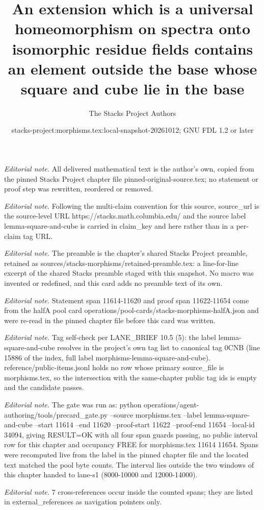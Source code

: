 \documentclass[10pt,a4paper]{amsart}
\title{An extension which is a universal homeomorphism on spectra onto isomorphic residue fields contains an element outside the base whose square and cube lie in the base}
\author{The Stacks Project Authors}
\date{stacks-project:morphisms.tex:local-snapshot-20261012; GNU FDL 1.2 or later}
\theoremstyle{plain}
\theoremstyle{definition}
\theoremstyle{remark}
\numberwithin{equation}{subsection}
\begin{document}
\maketitle
\noindent\textit{Editorial note.} All delivered mathematical text is the author's own, copied from the pinned Stacks Project chapter file pinned-original-source.tex; no statement or proof step was rewritten, reordered or removed.\par\medskip
\noindent\textit{Editorial note.} Following the multi-claim convention for this source, source\_url is the source-level URL https://stacks.math.columbia.edu/ and the source label lemma-square-and-cube is carried in claim\_key and here rather than in a per-claim tag URL.\par\medskip
\noindent\textit{Editorial note.} The preamble is the chapter's shared Stacks Project preamble, retained as sources/stacks-morphisms/retained-preamble.tex: a line-for-line excerpt of the shared Stacks preamble staged with this snapshot. No macro was invented or redefined, and this card adds no preamble text of its own.\par\medskip
\noindent\textit{Editorial note.} Statement span 11614-11620 and proof span 11622-11654 come from the halfA pool card operations/pool-cards/stacks-morphisms-halfA.json and were re-read in the pinned chapter file before this card was written.\par\medskip
\noindent\textit{Editorial note.} Tag self-check per LANE\_BRIEF 10.5 (5): the label lemma-square-and-cube resolves in the project's own tag list to canonical tag 0CNB (line 15886 of the index, full label morphisms-lemma-square-and-cube). reference/public-items.jsonl holds no row whose primary source\_file is morphisms.tex, so the intersection with the same-chapter public tag ids is empty and the candidate passes.\par\medskip
\noindent\textit{Editorial note.} The gate was run as: python operations/agent-authoring/tools/precard\_gate.py --source morphisms.tex --label lemma-square-and-cube --start 11614 --end 11620 --proof-start 11622 --proof-end 11654 --local-id 34094, giving RESULT=OK with all four span guards passing, no public interval row for this chapter and occupancy FREE for morphisms.tex 11614 11654. Spans were recomputed live from the label in the pinned chapter file and the located text matched the pool byte counts. The interval lies outside the two windows of this chapter handed to lane-s1 (8000-10000 and 12000-14000).\par\medskip
\noindent\textit{Editorial note.} 7 cross-references occur inside the counted spans; they are listed in external\_references as navigation pointers only.\par\medskip
\end{document}
